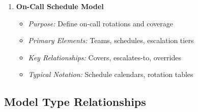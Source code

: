 \documentclass[11pt,letterpaper]{article}
\begin{document}
\begin{enumerate}[label=\textbf{MT\arabic*:}, leftmargin=2.5em]
    \item \textbf{On-Call Schedule Model}
    \begin{itemize}[nosep]
        \item \textit{Purpose:} Define on-call rotations and coverage
        \item \textit{Primary Elements:} Teams, schedules, escalation tiers
        \item \textit{Key Relationships:} Covers, escalates-to, overrides
        \item \textit{Typical Notation:} Schedule calendars, rotation tables
    \end{itemize}
\end{enumerate}

\subsection{Model Type Relationships}
\end{document}
